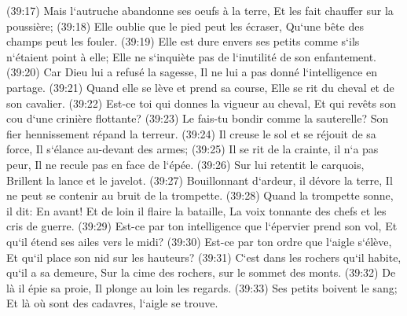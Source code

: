 \verse (39:17) Mais l`autruche abandonne ses oeufs à la terre, Et les fait chauffer sur la poussière; 
\verse (39:18) Elle oublie que le pied peut les écraser, Qu`une bête des champs peut les fouler. 
\verse (39:19) Elle est dure envers ses petits comme s`ils n`étaient point à elle; Elle ne s`inquiète pas de l`inutilité de son enfantement. 
\verse (39:20) Car Dieu lui a refusé la sagesse, Il ne lui a pas donné l`intelligence en partage. 
\verse (39:21) Quand elle se lève et prend sa course, Elle se rit du cheval et de son cavalier. 
\verse (39:22) Est-ce toi qui donnes la vigueur au cheval, Et qui revêts son cou d`une crinière flottante? 
\verse (39:23) Le fais-tu bondir comme la sauterelle? Son fier hennissement répand la terreur. 
\verse (39:24) Il creuse le sol et se réjouit de sa force, Il s`élance au-devant des armes; 
\verse (39:25) Il se rit de la crainte, il n`a pas peur, Il ne recule pas en face de l`épée. 
\verse (39:26) Sur lui retentit le carquois, Brillent la lance et le javelot. 
\verse (39:27) Bouillonnant d`ardeur, il dévore la terre, Il ne peut se contenir au bruit de la trompette. 
\verse (39:28) Quand la trompette sonne, il dit: En avant! Et de loin il flaire la bataille, La voix tonnante des chefs et les cris de guerre. 
\verse (39:29) Est-ce par ton intelligence que l`épervier prend son vol, Et qu`il étend ses ailes vers le midi? 
\verse (39:30) Est-ce par ton ordre que l`aigle s`élève, Et qu`il place son nid sur les hauteurs? 
\verse (39:31) C`est dans les rochers qu`il habite, qu`il a sa demeure, Sur la cime des rochers, sur le sommet des monts. 
\verse (39:32) De là il épie sa proie, Il plonge au loin les regards. 
\verse (39:33) Ses petits boivent le sang; Et là où sont des cadavres, l`aigle se trouve. 

